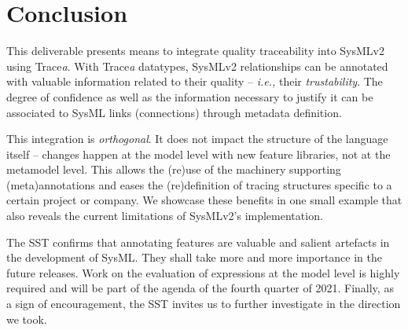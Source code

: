 \section{Conclusion}\label{sec:conclusion}

This deliverable presents means to integrate quality traceability into SysMLv2 using Trace\textit{a}.
With Trace\textit{a} datatypes, SysMLv2 relationships can be annotated with valuable information related to their quality -- \textit{i.e.,} their \textit{trustability}. 
The degree of confidence as well as the information necessary to justify it can be associated to SysML links (connections) through metadata definition.


This integration is \textit{orthogonal}. It does not impact the structure of the language itself -- changes happen at the model level with new feature libraries, not at the metamodel level.
This allows the (re)use of the machinery supporting (meta)annotations and eases the (re)definition of tracing structures specific to a certain project or company. We showcase these benefits in one small example that also reveals the current limitations of SysMLv2's implementation.

The SST confirms that annotating features are valuable and salient artefacts in the development of SysML. They shall take more and more importance in the future releases. Work on the evaluation of expressions at the model level is highly required and will be part of the agenda of the fourth quarter of 2021. 
Finally, as a sign of encouragement, the SST invites us to further investigate in the direction we took. 
